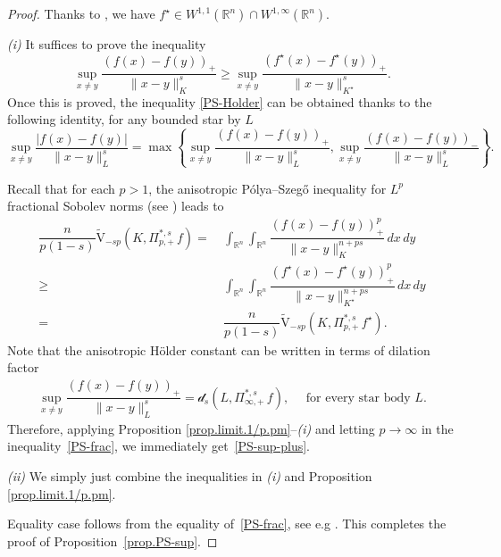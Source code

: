 \documentclass[11pt, reqno]{article}
\theoremstyle{definition}
\numberwithin{equation}{section}
\newcommand{\R}{\mathbb{R}}
\newcommand{\vtil}{\widetilde{\mathrm{V}}}
\newcommand{\dila}{\mathscr{d}}
\begin{document}
\begin{proof}
Thanks to \cite[Theorem 8.2, Corollary 8.2]{BS_2000}, we have $f^\star \in W^{1, 1}(\R^n) \cap W^{1, \infty}(\R^n)$.

\medskip

\textit{(i)}
It suffices to prove the inequality
\begin{equation}\label{PS-sup-plus}
	\sup_{x \neq y} \dfrac{(f(x) - f(y))_+}{\| x - y \|_K^s} \geq \sup_{x \neq y} \dfrac{(f^\star(x) - f^\star(y))_+}{\| x - y \|_{K^\star}^s}.
\end{equation}
Once this is proved, the inequality \eqref{PS-Holder} can be obtained thanks to the following identity, for any bounded star by $L$
 	\[
 		\sup_{x \neq y} \dfrac{|f(x) - f(y)|}{\| x - y \|_L^s} = \max \left\{ \sup_{x \neq y} \dfrac{(f(x) - f(y))_+}{\| x - y \|_L^s}, \sup_{x \neq y} \dfrac{(f(x) - f(y))_-}{\| x - y \|_L^s} \right\}.
 	\]	
 	
\medskip

Recall that for each $p > 1$, the anisotropic P\'olya--Szeg\H{o} inequality for $L^p$ fractional Sobolev norms (see \cite[Theorem 11]{HL_2024}) leads to
\begin{equation}\label{PS-frac}
    \begin{split}
	\dfrac{n}{p(1 - s)}\vtil_{-sp}(K, \Pi^{\ast, s}_{p, +} \, f) = & ~ \int_{\R^n} \int_{\R^n} \dfrac{(f(x) - f(y))_+^p}{\| x - y \|_K^{n + ps}} \,dx\,dy \\
    \geq & ~ \int_{\R^n} \int_{\R^n} \dfrac{(f^\star(x) - f^\star(y))_+^p}{\| x - y \|_{K^\star}^{n + ps}} \,dx\,dy \\
    = & ~  
    \dfrac{n}{p(1 - s)}\vtil_{-sp}(K, \Pi^{\ast, s}_{p, +} \, f^\star).
    \end{split}
\end{equation}
Note that the anisotropic H\"older constant can be written in terms of  dilation factor
\begin{align*}
	\sup_{x \neq y} \dfrac{(f(x) - f(y))_+}{\| x - y \|_L^s} = \dila_s(L, \Pi^{\ast, s}_{\infty, +} \, f), \quad \text{ for every star body } L.
\end{align*}
Therefore, applying Proposition \ref{prop.limit.1/p.pm}--\textit{(i)} and letting $p \to \infty$ in the inequality~\eqref{PS-frac}, we immediately get~\eqref{PS-sup-plus}.

\medskip

\textit{(ii)} We simply just combine the inequalities in \textit{(i)} and Proposition \ref{prop.limit.1/p.pm}.

Equality case follows from the equality of~\eqref{PS-frac}, see e.g \cite[Theorem 11]{HL_2024}.
 This completes the proof of Proposition~\ref{prop.PS-sup}.
\end{proof}
\end{document}
